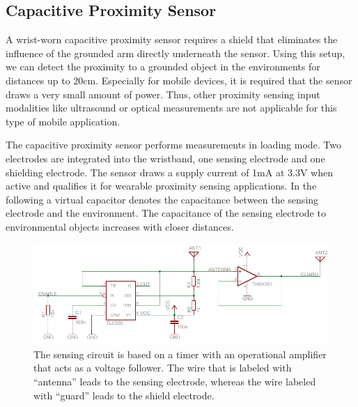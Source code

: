 \documentclass[runningheads,a4paper]{llncs}
\begin{document}
\subsection{Capacitive Proximity Sensor}

A wrist-worn capacitive proximity sensor requires a shield that eliminates the influence of the grounded arm directly underneath the sensor. Using this setup, we can detect the proximity to a grounded object in the environments for distances up to 20cm. Especially for mobile devices, it is required that the sensor draws a very small amount of power. Thus, other proximity sensing input modalities like ultrasound or optical measurements are not applicable for this type of mobile application.

The capacitive proximity sensor performs measurements in loading mode. Two electrodes are integrated into the wristband, one sensing electrode and one shielding electrode. The sensor draws a supply current of 1mA at 3.3V when active and qualifies it for wearable proximity sensing applications. In the following a virtual capacitor denotes the capacitance between the sensing electrode and the environment. The capacitance of the sensing electrode to environmental objects increases with closer distances.

\begin{figure}
	\centering
		\includegraphics[width=1.00\textwidth]{Images/schematic.pdf}
	\caption{The sensing circuit is based on a timer with an operational amplifier that acts as a voltage follower. The wire that is labeled with ``antenna'' leads to the sensing electrode, whereas the wire labeled with ``guard'' leads to the shield electrode.}
	\label{fig:schematic}
\end{figure}
\end{document}

